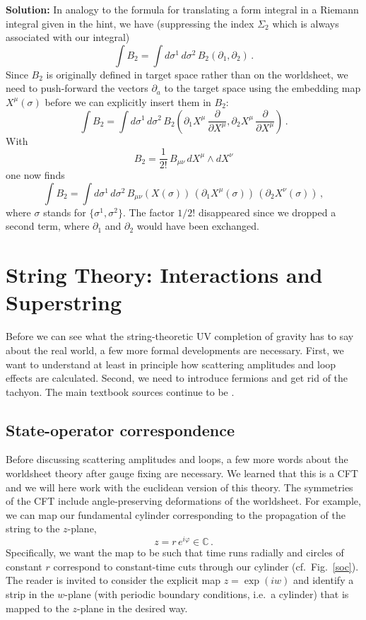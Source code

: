 \documentclass[12pt]{article}
\newcommand{\be}{\begin{equation}}
\newcommand{\ee}{\end{equation}}
\numberwithin{equation}{section}
\begin{document}
\noindent
{\bf Solution:} In analogy to the formula for translating a form integral in a Riemann integral given in the hint, we have (suppressing the index $\Sigma_2$ which is always associated with our integral)
\be
\int B_2=\int d\sigma^1\,d\sigma^2\,B_2(\partial_1,\partial_2)\,.
\ee
Since $B_2$ is originally defined in target space rather than on the worldsheet, we need to push-forward the vectors $\partial_a$ to the target space using the embedding map $X^\mu(\sigma)$ before we can explicitly insert them in $B_2$:
\be
\int B_2= \int d\sigma^1\,d\sigma^2\,B_2\left(\partial_1 X^\mu\, \frac{\partial}{\partial X^\mu},\partial_2 X^\mu\, \frac{\partial}{\partial X^\mu}\right)\,.
\ee
With 
\be
B_2=\frac{1}{2!}\,B_{\mu\nu}\,dX^\mu\wedge dX^\nu
\ee
one now finds
\be
\int B_2= \int d\sigma^1\,d\sigma^2\,B_{\mu\nu}(X(\sigma))\,(\partial_1 X^\mu(\sigma))\,(\partial_2 X^\nu(\sigma))\,,
\ee
where $\sigma$ stands for $\{\sigma^1,\sigma^2\}$. The factor $1/2!$ disappeared since we dropped a second term, where $\partial_1$ and $\partial_2$ would have been exchanged.






\section{String Theory: Interactions and Superstring}\label{stss}

Before we can see what the string-theoretic UV completion of gravity has to say about the real world, a few more formal developments are necessary. First, we want to understand at least in principle how scattering amplitudes and loop effects are calculated. Second, we need to introduce fermions and get rid of the tachyon. The main textbook sources continue to be \cite{Green:1987sp, Polchinski:1998rq, Blumenhagen:2013fgp, bbs, kir}.




\subsection{State-operator correspondence}

Before discussing scattering amplitudes and loops, a few more words about the worldsheet theory after gauge fixing are necessary. We learned that this is a CFT and we will here work with the euclidean version of this theory. The symmetries of the CFT include angle-preserving deformations of the worldsheet. For example, we can map our fundamental cylinder corresponding to the propagation of the string to the $z$-plane, 
\be
z=r\,e^{i\varphi}\in\mathbb{C}\,.
\ee
Specifically, we want the map to be such that time runs radially and circles of constant $r$ correspond to constant-time cuts through our cylinder (cf.~Fig.~\ref{soc}). The reader is invited to consider the explicit map $z=\exp(iw)$ and identify a strip in the $w$-plane (with periodic boundary conditions, i.e.~a cylinder) that is mapped to the $z$-plane in the desired way.
\end{document}
